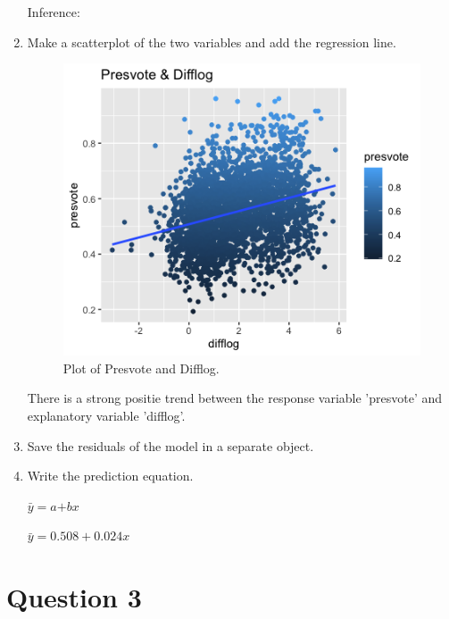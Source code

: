 \documentclass[12pt,letterpaper]{article}
\begin{document}
\begin{enumerate}
Inference: 

\vspace{2cm}
		
		\item Make a scatterplot of the two variables and add the regression line. 	

  

\begin{figure}[h!]\centering
	\caption{\footnotesize Plot of Presvote and Difflog.}
	\label{fig:plot_1}
	\includegraphics[width=.75\textwidth]{plot_2.png}
\end{figure}

There is a strong positie trend between the response variable 'presvote' and explanatory variable 'difflog'. \vspace{2cm}
		
		\item Save the residuals of the model in a separate object.	

  		
		
		\item Write the prediction equation.

$\bar{y} =\textit{a+bx}  $


$\bar{y}=0.508+0.024x $

	\end{enumerate}
	
	\newpage	
	
\section*{Question 3}
\end{document}
